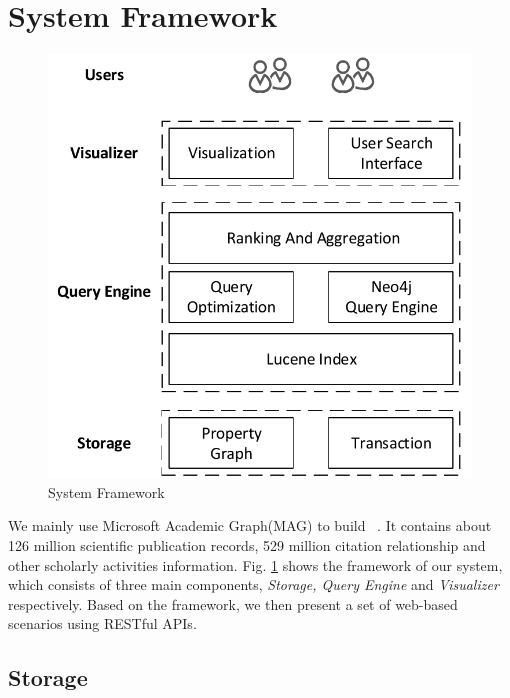 \section{System Framework}
\label{sec-system}

\begin{figure}
\centering
\includegraphics[width=0.5\columnwidth]{systemFrame.pdf}
\caption{System Framework}
\label{fig:frame}
\vspace{-2ex}
\end{figure}

\par
We mainly use Microsoft Academic Graph(MAG) to build \oursystem ~\cite{sinha2015overview}. It contains about 126 million scientific publication records, 529 million citation relationship and other scholarly activities information. Fig. \ref{fig:frame} shows the framework of our system, which consists of three main components, \emph{Storage, Query Engine} and \emph{Visualizer} respectively. Based on the framework, we then present a set of web-based scenarios using RESTful APIs.



\subsection{Storage}

